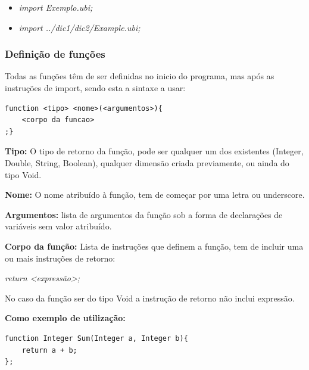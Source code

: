 \documentclass[10pt,portuguese]{article}
\begin{document}
\begin{itemize}
    \item \textit{import Exemplo.ubi;}
    \item \textit{import ../dic1/dic2/Example.ubi;}
\end{itemize}

\subsubsection{Definição de funções}
\par Todas as funções têm de ser definidas no inicio do programa, mas após as instruções de import, sendo esta a sintaxe a usar:

\begin{lstlisting}[numbers=none]
function <tipo> <nome>(<argumentos>){
    <corpo da funcao>
;}
\end{lstlisting}

\newline
\par \textbf{Tipo:} O tipo de retorno da função, pode ser qualquer um dos existentes (Integer, Double, String, Boolean), qualquer dimensão criada previamente, ou ainda do tipo Void.
\par \textbf{Nome:} O nome atribuído à função, tem de começar por uma letra ou underscore.
\par \textbf{Argumentos:} lista de argumentos da função sob a forma de declarações de variáveis sem valor atribuído.
\par \textbf{Corpo da função:} Lista de instruções que definem a função, tem de incluir uma ou mais instruções de retorno:
\par \textit{return <expressão>;}
\par No caso da função ser do tipo Void a instrução de retorno não inclui expressão.
\newline
\par \textbf{Como exemplo de utilização:}
\begin{lstlisting}[numbers=none]
function Integer Sum(Integer a, Integer b){
    return a + b;
};
\end{lstlisting}
\end{document}
